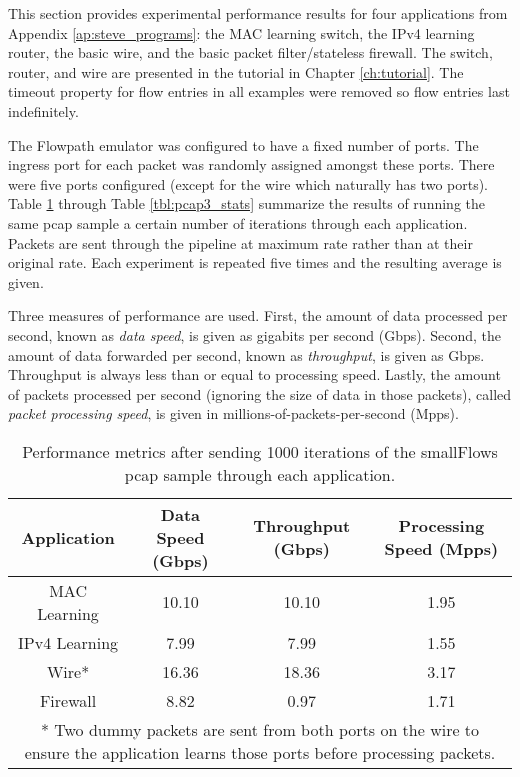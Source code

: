 This section provides experimental performance results for four applications from Appendix \ref{ap:steve_programs}: the MAC learning switch, the IPv4 learning router, the basic wire, and the basic packet filter/stateless firewall. The switch, router, and wire are presented in the tutorial in Chapter \ref{ch:tutorial}. The timeout property for flow entries in all examples were removed so flow entries last indefinitely.

The Flowpath emulator was configured to have a fixed number of ports. The ingress port for each packet was randomly assigned amongst these ports. There were five ports configured (except for the wire which naturally has two ports). Table \ref{tbl:pcap1_stats} through Table \ref{tbl:pcap3_stats} summarize the results of running the same pcap sample a certain number of iterations through each application. Packets are sent through the pipeline at maximum rate rather than at their original rate. Each experiment is repeated five times and the resulting average is given.

Three measures of performance are used. First, the amount of data processed per second, known as \textit{data speed}, is given as gigabits per second (Gbps). Second, the amount of data forwarded per second, known as \textit{throughput}, is given as Gbps. Throughput is always less than or equal to processing speed. Lastly, the amount of packets processed per second (ignoring the size of data in those packets), called \textit{packet processing speed}, is given in millions-of-packets-per-second (Mpps).

\begin{table}
\caption{Performance metrics after sending 1000 iterations of the smallFlows pcap sample through each application.}
\begin{center}
\begin{tabularx}{\textwidth}{| c || c | c | c | }
\hline
Application & Data Speed (Gbps) & Throughput (Gbps) & Processing Speed (Mpps)  \\
\hline
MAC Learning & 10.10 & 10.10 & 1.95  \\
\hline
IPv4 Learning & 7.99 & 7.99 & 1.55  \\
\hline 
Wire* & 16.36 & 18.36 & 3.17 \\
\hline
Firewall & 8.82 & 0.97 & 1.71 \\
\hline
\multicolumn{4}{p{\linewidth}}{* Two dummy packets are sent from both ports on the wire to ensure the application learns those ports before processing packets.}
\end{tabularx}
\end{center}
\label{tbl:pcap1_stats}
\end{table}


